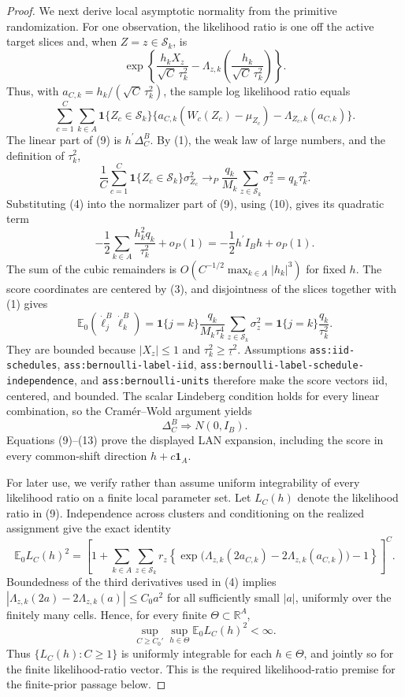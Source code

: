 \documentclass{article}
\begin{document}
\begin{proof}
We next derive local asymptotic normality from the primitive randomization.  For one observation, the likelihood ratio is one off the active target slices and, when \(Z=z\in\mathcal S_k\), is
\[
\exp\!\left\{\frac{h_kX_z}{\sqrt C\,\tau_k^2}
-\Lambda_{z,k}\!\left(\frac{h_k}{\sqrt C\,\tau_k^2}\right)\right\}.
\tag{8}
\]
Thus, with \(a_{C,k}=h_k/(\sqrt C\,\tau_k^2)\), the sample log likelihood ratio equals
\[
\sum_{c=1}^C\sum_{k\in A}\mathbf1\{Z_c\in\mathcal S_k\}
\{a_{C,k}(W_c(Z_c)-\mu_{Z_c})-\Lambda_{Z_c,k}(a_{C,k})\}.
\tag{9}
\]
The linear part of (9) is \(h^{\prime}\Delta_C^B\).  By (1), the weak law of large numbers, and the definition of \(\tau_k^2\),
\[
\frac1C\sum_{c=1}^C
\mathbf1\{Z_c\in\mathcal S_k\}\sigma_{Z_c}^2
\longrightarrow_P
\frac{q_k}{M_k}\sum_{z\in\mathcal S_k}\sigma_z^2
=q_k\tau_k^2.
\tag{10}
\]
Substituting (4) into the normalizer part of (9), using (10), gives its quadratic term
\[
-\frac12\sum_{k\in A}\frac{h_k^2q_k}{\tau_k^2}+o_P(1)
=-\frac12h^{\prime}I_Bh+o_P(1).
\tag{11}
\]
The sum of the cubic remainders is \(O(C^{-1/2}\max_{k\in A}|h_k|^3)\) for fixed \(h\).  The score coordinates are centered by (3), and disjointness of the slices together with (1) gives
\[
\mathbb E_0(\dot\ell_j^B\dot\ell_k^B)
=\mathbf1\{j=k\}\frac{q_k}{M_k\tau_k^4}
\sum_{z\in\mathcal S_k}\sigma_z^2
=\mathbf1\{j=k\}\frac{q_k}{\tau_k^2}.
\tag{12}
\]
They are bounded because \(|X_z|\leq1\) and \(\tau_k^2\geq\underline\tau^2\).  Assumptions \texttt{ass:iid-schedules}, \texttt{ass:bernoulli-label-iid}, \texttt{ass:bernoulli-label-schedule-independence}, and \texttt{ass:bernoulli-units} therefore make the score vectors iid, centered, and bounded.  The scalar Lindeberg condition holds for every linear combination, so the Cram\'{e}r--Wold argument yields
\[
\Delta_C^B\Rightarrow N(0,I_B).
\tag{13}
\]
Equations (9)--(13) prove the displayed LAN expansion, including the score in every common-shift direction \(h+c\mathbf1_A\).

For later use, we verify rather than assume uniform integrability of every likelihood ratio on a finite local parameter set.  Let \(L_C(h)\) denote the likelihood ratio in (9).  Independence across clusters and conditioning on the realized assignment give the exact identity
\[
\mathbb E_0L_C(h)^2
=\left[
1+\sum_{k\in A}\sum_{z\in\mathcal S_k}r_z
\left\{\exp\bigl(\Lambda_{z,k}(2a_{C,k})
-2\Lambda_{z,k}(a_{C,k})\bigr)-1\right\}
\right]^C.
\tag{14}
\]
Boundedness of the third derivatives used in (4) implies
\(\left|\Lambda_{z,k}(2a)-2\Lambda_{z,k}(a)\right|\leq C_0a^2\) for all sufficiently small \(|a|\), uniformly over the finitely many cells.  Hence, for every finite \(\Theta\subset\mathbb R^A\),
\[
\sup_{C\geq C_0'}\sup_{h\in\Theta}\mathbb E_0L_C(h)^2<\infty.
\tag{15}
\]
Thus \(\{L_C(h):C\geq1\}\) is uniformly integrable for each \(h\in\Theta\), and jointly so for the finite likelihood-ratio vector.  This is the required likelihood-ratio premise for the finite-prior passage below.


\end{proof}
\end{document}
